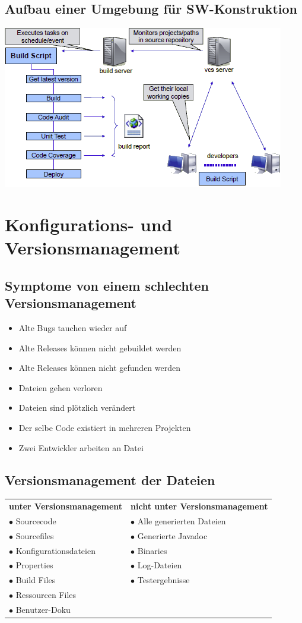 \documentclass[a4paper,10pt]{article}
\newcommand{\Bold}[1]{\textbf{#1}} %
\begin{document}
\subsection{Aufbau einer Umgebung für SW-Konstruktion}
\begin{center}
 \includegraphics[scale=1.2]{umgebung_sw_konstruktion.png}
\end{center}
\pagebreak

\section{Konfigurations- und Versionsmanagement}
\subsection{Symptome von einem schlechten Versionsmanagement}
\begin{itemize}
 \item Alte Bugs tauchen wieder auf
 \item Alte Releases können nicht gebuildet werden
 \item Alte Releases können nicht gefunden werden
 \item Dateien gehen verloren
 \item Dateien sind plötzlich verändert
 \item Der selbe Code existiert in mehreren Projekten
 \item Zwei Entwickler arbeiten an Datei
\end{itemize}

\subsection{Versionsmanagement der Dateien}
\begin{tabular}{ll}
 \Bold{unter Versionsmanagement}&\Bold{nicht unter Versionsmanagement}\\
 $\bullet$ Sourcecode&$\bullet$ Alle generierten Dateien\\
 $\bullet$ Sourcefiles&$\bullet$ Generierte Javadoc\\
 $\bullet$ Konfigurationsdateien&$\bullet$ Binaries\\
 $\bullet$ Properties&$\bullet$ Log-Dateien\\
 $\bullet$ Build Files&$\bullet$ Testergebnisse\\
 $\bullet$ Ressourcen Files&\\
 $\bullet$ Benutzer-Doku&\\
\end{tabular}
\end{document}
